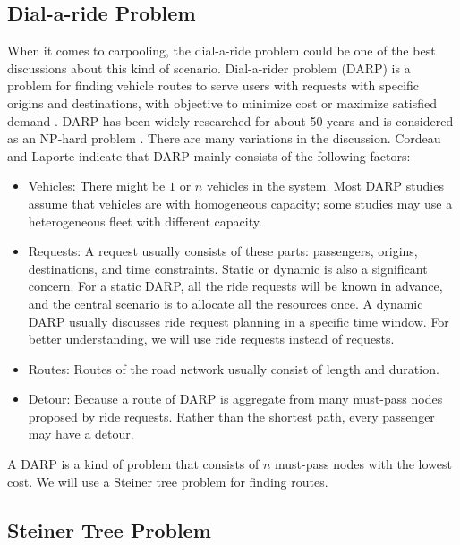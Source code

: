 \subsection{Dial-a-ride Problem}

When it comes to carpooling, the dial-a-ride problem could be one of the best discussions about this kind of scenario. Dial-a-rider problem (DARP) is a problem for finding vehicle routes to serve users with requests with specific origins and destinations, with objective to minimize cost or maximize satisfied demand \cite{cordeau_dialaride_2007}. DARP has been widely researched for about 50 years \cite{wilson_scheduling_1971} and is considered as an NP-hard problem \cite{cordeau_branchandcut_2006}. There are many variations in the discussion. Cordeau and Laporte \cite{cordeau_dialaride_2007} indicate that DARP mainly consists of the following factors:

\begin{itemize}
  \item Vehicles: There might be $1$ or $n$ vehicles in the system. Most DARP studies assume that vehicles are with homogeneous capacity; some studies may use a heterogeneous fleet with different capacity.
  \item Requests: A request usually consists of these parts: passengers, origins, destinations, and time constraints. Static or dynamic is also a significant concern. For a static DARP, all the ride requests will be known in advance, and the central scenario is to allocate all the resources once. A dynamic DARP usually discusses ride request planning in a specific time window. For better understanding, we will use ride requests instead of requests.
  \item Routes: Routes of the road network usually consist of length and duration.
  \item Detour: Because a route of DARP is aggregate from many must-pass nodes proposed by ride requests. Rather than the shortest path, every passenger may have a detour.
\end{itemize}

A DARP is a kind of problem that consists of $n$ must-pass nodes with the lowest cost. We will use a Steiner tree problem for finding routes.

\subsection{Steiner Tree Problem}

